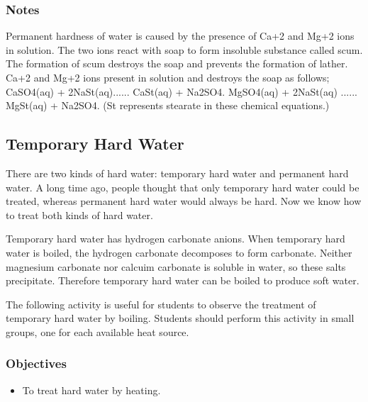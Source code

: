 \subsubsection*{Notes}
Permanent hardness of water is caused by the presence of Ca+2 and Mg+2 ions in solution. The two ions react with soap to form insoluble substance called scum. The formation of scum destroys the soap and prevents the formation of lather. Ca+2 and Mg+2 ions present in solution and destroys the soap as follows;
CaSO4(aq) + 2NaSt(aq)...... CaSt(aq) + Na2SO4.
MgSO4(aq) + 2NaSt(aq) ...... MgSt(aq) + Na2SO4.
(St represents stearate in these chemical equations.)

\subsection{Temporary Hard Water}

There are two kinds of hard water: temporary hard water and permanent hard water. A long time ago, people thought that only temporary hard water could be treated, whereas permanent hard water would always be hard. Now we know how to treat both kinds of hard water.

Temporary hard water has hydrogen carbonate anions. When temporary hard water is boiled, the hydrogen carbonate decomposes to form carbonate. Neither magnesium carbonate nor calcuim carbonate is soluble in water, so these salts precipitate. Therefore temporary hard water can be boiled to produce soft water.

The following activity is useful for students to observe the treatment of temporary hard water by boiling. Students should perform this activity in small groups, one for each available heat source.

\subsubsection*{Objectives}
\begin{itemize}
\item{To treat hard water by heating.}
\end{itemize}

